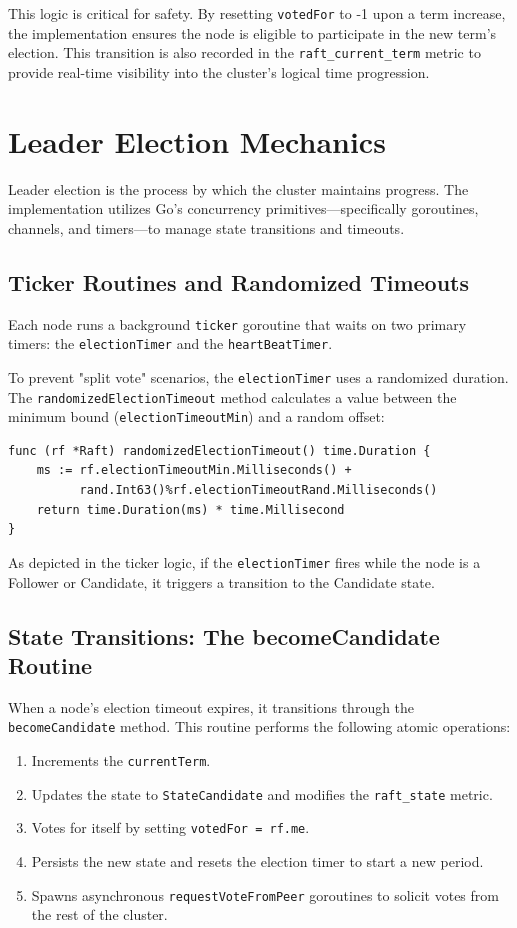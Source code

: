 This logic is critical for safety.
By resetting \texttt{votedFor} to -1 upon a term increase, the implementation ensures the node is eligible to participate in the new term's election. This transition is also recorded in the \texttt{raft\_current\_term} metric to provide real-time visibility into the cluster's logical time progression.

\section{Leader Election Mechanics}
Leader election is the process by which the cluster maintains progress. The implementation utilizes Go's concurrency primitives—specifically goroutines, channels, and timers—to manage state transitions and timeouts.

\subsection{Ticker Routines and Randomized Timeouts}
Each node runs a background \texttt{ticker} goroutine that waits on two primary timers: the \texttt{electionTimer} and the \texttt{heartBeatTimer}. 

To prevent "split vote" scenarios, the \texttt{electionTimer} uses a randomized duration. The \texttt{randomizedElectionTimeout} method calculates a value between the minimum bound (\texttt{electionTimeoutMin}) and a random offset:

\begin{verbatim}
func (rf *Raft) randomizedElectionTimeout() time.Duration {
    ms := rf.electionTimeoutMin.Milliseconds() + 
          rand.Int63()%rf.electionTimeoutRand.Milliseconds()
    return time.Duration(ms) * time.Millisecond
}
\end{verbatim}

As depicted in the ticker logic, if the \texttt{electionTimer} fires while the node is a Follower or Candidate, it triggers a transition to the Candidate state.

\subsection{State Transitions: The becomeCandidate Routine}
When a node's election timeout expires, it transitions through the \texttt{becomeCandidate} method.
This routine performs the following atomic operations:
\begin{enumerate}
    \item Increments the \texttt{currentTerm}.
    \item Updates the state to \texttt{StateCandidate} and modifies the \texttt{raft\_state} metric.
    \item Votes for itself by setting \texttt{votedFor = rf.me}.
    \item Persists the new state and resets the election timer to start a new period.
    \item Spawns asynchronous \texttt{requestVoteFromPeer} goroutines to solicit votes from the rest of the cluster.
\end{enumerate}

